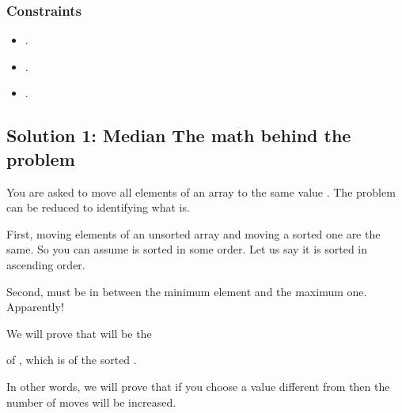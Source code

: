 \documentclass[letterpaper,12pt,english]{book}
\begin{document}
\subsubsection{Constraints}
\label{\detokenize{Mathematics/09_MTH_462_Minimum_Moves_to_Equal_Array_Elements_II:constraints}}\begin{itemize}
\item {} 
\sphinxAtStartPar
{}.

\item {} 
\sphinxAtStartPar
{}.

\item {} 
\sphinxAtStartPar
{}.

\end{itemize}


\subsection{Solution 1: Median \sphinxhyphen{} The math behind the problem}
\label{\detokenize{Mathematics/09_MTH_462_Minimum_Moves_to_Equal_Array_Elements_II:solution-1-median-the-math-behind-the-problem}}
\sphinxAtStartPar
You are asked to move all elements of an array to the same value . The problem can be reduced to identifying what  is.

\sphinxAtStartPar
First, moving elements of an unsorted array and moving a sorted one are the same. So you can assume  is sorted in some order. Let us say it is sorted in ascending order.

\sphinxAtStartPar
Second,  must be in between the minimum element and the maximum one. Apparently!

\sphinxAtStartPar
We will prove that  will be the %
\begin{footnote}[130]\sphinxAtStartFootnote
{}
%
\end{footnote} of , which is  of the sorted .

\sphinxAtStartPar
In other words, we will prove that if you choose  a value different from  then the number of moves will be increased.
\end{document}
